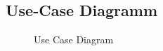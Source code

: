 \documentclass[11pt, a4paper]{article}
\begin{document}
    \subsection{Use-Case Diagramm}
      \begin{figure}[h!]
        \caption{Use Case Diagram}
        \label{fig:usecasediagram}
      \end{figure}
      \newpage
\end{document}
